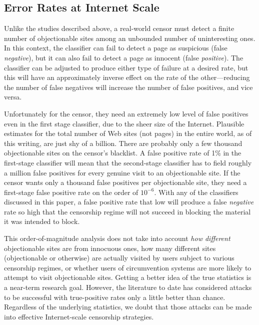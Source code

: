 \documentclass{cmuecequal}
\begin{document}
\subsection{Error Rates at Internet Scale}

Unlike the studies described above, a real-world censor must detect a
finite number of objectionable sites among an unbounded number of
uninteresting ones.  In this context, the classifier can fail to
detect a page as suspicious (false \emph{negative}), but it can also
fail to detect a page as innocent (false \emph{positive}).  The
classifier can be adjusted to produce either type of failure at a
desired rate, but this will have an approximately inverse effect on
the rate of the other---reducing the number of false negatives will
increase the number of false positives, and vice versa.

Unfortunately for the censor, they need an extremely low level of
false positives even in the first stage classifier, due to the sheer
size of the Internet. Plausible estimates for the total number of Web
sites (not pages) in the entire world, as of this writing, are just
shy of a billion.  There are probably only a few thousand
objectionable sites on the censor's blacklist.  A false positive rate
of 1\% in the first-stage classifier will mean that the second-stage
classifier has to field roughly a million false positives for every
genuine visit to an objectionable site.  If the censor wants only a
thousand false positives per objectionable site, they need a
first-stage false positive rate on the order of $10^{-6}$.  With any
of the classifiers discussed in this paper, a false positive rate that
low will produce a false \emph{negative} rate so high that the
censorship regime will not succeed in blocking the material it was
intended to block.

This order-of-magnitude analysis does not take into account \emph{how
  different} objectionable sites are from innocuous ones, how many
different sites (objectionable or otherwise) are actually visited by
users subject to various censorship regimes, or whether users of
circumvention systems are more likely to attempt to visit
objectionable sites. Getting a better idea of the true statistics is a
near-term research goal.  However, the literature to date has
considered attacks to be successful with true-positive rates only a
little better than chance.  Regardless of the underlying statistics,
we doubt that those attacks can be made into effective Internet-scale
censorship strategies.


\end{document}
